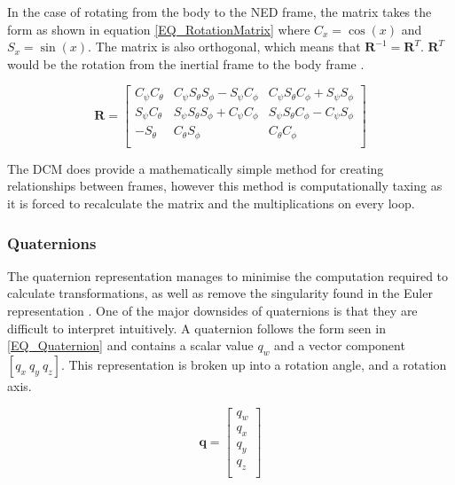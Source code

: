 		In the case of rotating from the body to the NED frame, the matrix takes the form as shown in equation \eqref{EQ_RotationMatrix} \cite{Luukkonen, Moller2015} where $C_x = \cos(x)$ and $S_x = \sin(x)$. The matrix is also orthogonal, which means that $\textbf{R}^{-1} = \textbf{R}^T$. $\textbf{R}^T$ would be the rotation from the inertial frame to the body frame \cite{Luukkonen, Moller2015, quaternion}.
		
		\begin{equation}
		\label{EQ_RotationMatrix}
		\textbf{R} = 
		\begin{bmatrix}
		C_\psi C_\theta   	& C_\psi S_\theta S_\phi - S_\psi C_\phi & C_\psi S_\theta C_\phi + S_\psi S_\phi \\
		S_\psi C_\theta   	& S_\psi S_\theta S_\phi + C_\psi C_\phi & S_\psi S_\theta C_\phi - C_\psi S_\phi\\
		-S_\theta   		& C_\theta S_\phi & C_\theta C_\phi  \\
		\end{bmatrix}
		\end{equation}
		
		The DCM does provide a mathematically simple method for creating relationships between frames, however this method is computationally taxing as it is forced to recalculate the matrix and the multiplications on every loop.
		
		\subsubsection{Quaternions}
		The quaternion representation manages to minimise the computation required to calculate transformations, as well as remove the singularity found in the Euler representation \cite{quaternion}. One of the major downsides of quaternions is that they are difficult to interpret intuitively. A quaternion follows the form seen in \eqref{EQ_Quaternion} and contains a scalar value $q_w$ and a vector component $[q_x \ q_y \ q_z]$. This representation is broken up into a rotation angle, and a rotation axis.
		
		\begin{equation}
		\label{EQ_Quaternion}
		\textbf{q} = 
		\begin{bmatrix}
		q_w \\
		q_x\\
		q_y\\
		q_z\\
		\end{bmatrix}
		\end{equation}
		
